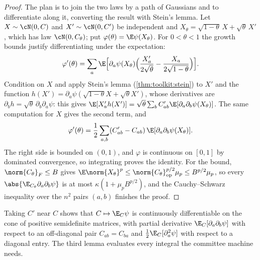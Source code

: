 \begin{refsection}
\begin{proof}
The plan is to join the two laws by a path of Gaussians and to differentiate along it, converting the result with Stein's lemma. Let $X\sim\cN(0,C)$ and $X'\sim\cN(0,C')$ be independent and $X_\theta=\sqrt{1-\theta}\,X+\sqrt\theta\,X'$, which has law $\cN(0,C_\theta)$; put $\varphi(\theta)=\E\psi(X_\theta)$. For $0<\theta<1$ the growth bounds justify differentiating under the expectation:
\[
  \varphi'(\theta)=\sum_a\E\Bigl[\partial_a\psi(X_\theta)\Bigl(\frac{X'_a}{2\sqrt\theta}-\frac{X_a}{2\sqrt{1-\theta}}\Bigr)\Bigr].
\]
Condition on $X$ and apply Stein's lemma (\cref{thm:toolkit:stein}) to $X'$ and the function $h(X')=\partial_a\psi(\sqrt{1-\theta}X+\sqrt\theta X')$, whose derivatives are $\partial_bh=\sqrt\theta\,\partial_b\partial_a\psi$: this gives $\E[X'_ah(X')]=\sqrt\theta\sum_bC'_{ab}\E[\partial_a\partial_b\psi(X_\theta)]$. The same computation for $X$ gives the second term, and
\[
  \varphi'(\theta)=\frac12\sum_{a,b}(C'_{ab}-C_{ab})\,\E[\partial_a\partial_b\psi(X_\theta)].
\]
The right side is bounded on $(0,1)$, and $\varphi$ is continuous on $[0,1]$ by dominated convergence, so integrating proves the identity. For the bound, $\norm{C_\theta}_F\le B$ gives $\E\norm{X_\theta}^p\le\norm{C_\theta}_{\op}^{p/2}\mu_p\le B^{p/2}\mu_p$, so every $\abs{\E_{C_\theta}\partial_a\partial_b\psi}$ is at most $\kappa(1+\mu_pB^{p/2})$, and the Cauchy--Schwarz inequality over the $n^2$ pairs $(a,b)$ finishes the proof.
\end{proof}

Taking $C'$ near $C$ shows that $C\mapsto\E_C\psi$ is continuously differentiable on the cone of positive semidefinite matrices, with partial derivative $\E_C[\partial_a\partial_b\psi]$ with respect to an off-diagonal pair $C_{ab}=C_{ba}$ and $\frac12\E_C[\partial_a^2\psi]$ with respect to a diagonal entry. The third lemma evaluates every integral the committee machine needs.


\end{refsection}
